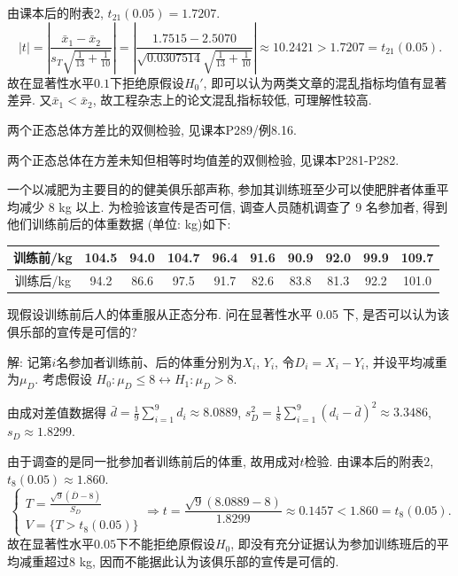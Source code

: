 \documentclass[standard]{ExBook}
\renewenvironment{shaded}{%
  \def\FrameCommand{\fboxsep=\FrameSep \colorbox{shadecolor}}%
  \MakeFramed{\advance\hsize-\width \FrameRestore}%
}{%
  \endMakeFramed
}
\begin{document}
\begin{qitems}
由课本后的附表2, $t_{21}(0.05)=1.7207$.
$$
|t|
=
\left|
\frac{\bar{x}_1-\bar{x}_2}
{s_T\sqrt{\frac{1}{13}+\frac{1}{10}}}
\right|
=
\left|
\frac{1.7515-2.5070}
{\sqrt{0.0307514}\sqrt{\frac{1}{13}+\frac{1}{10}}}
\right|
\approx10.2421
>
1.7207
=
t_{21}(0.05).
$$
故在显著性水平$0.1$下拒绝原假设$H_0'$, 即可以认为两类文章的混乱指标均值有显著差异. 又$\bar{x}_1<\bar{x}_2$, 故工程杂志上的论文混乱指标较低, 可理解性较高.

\textcolor{themeColor}{\selectfont {} 两个正态总体方差比的双侧检验, 见课本P289/例8.16.}

\textcolor{themeColor}{\selectfont {} 两个正态总体在方差未知但相等时均值差的双侧检验, 见课本P281-P282.}

\vspace{2.5cm-5em}

    \begin{bbox}
    \begin{shaded}
        \qitem
一个以减肥为主要目的的健美俱乐部声称, 参加其训练班至少可以使肥胖者体重平均减少 8 kg 以上. 为检验该宣传是否可信, 调查人员随机调查了 9 名参加者, 得到他们训练前后的体重数据 (单位: kg)如下:
\begin{center}
\setlength{\tabcolsep}{10.5pt}
\begin{tabular}{c|ccccccccc}
\hline
训练前/kg & 104.5 & 94.0 & 104.7 & 96.4 & 91.6 & 90.9 & 92.0 & 99.9 & 109.7\\
\hline
训练后/kg & 94.2 & 86.6 & 97.5 & 91.7 & 82.6 & 83.8 & 81.3 & 92.2 & 101.0\\
\hline
\end{tabular}
\end{center}
现假设训练前后人的体重服从正态分布. 问在显著性水平 0.05 下, 是否可以认为该俱乐部的宣传是可信的?
    \end{shaded}
    \end{bbox}

\vspace{\dimexpr2.5cm-5em\relax}

解: 记第$i$名参加者训练前、后的体重分别为$X_i$, $Y_i$, 令$D_i=X_i-Y_i$, 并设平均减重为$\mu_D$. 考虑假设
$
H_0:\mu_D\leq8
\longleftrightarrow
H_1:\mu_D>8
$.

由成对差值数据得
$
\bar{d}
=\frac{1}{9}\sum_{i=1}^{9}d_i
\approx8.0889
$,
$
s_D^2
=\frac{1}{8}\sum_{i=1}^{9}(d_i-\bar{d})^2
\approx3.3486
$,
$
s_D\approx1.8299
$.

由于调查的是同一批参加者训练前后的体重, 故用成对$t$检验. 由课本后的附表2, $t_8(0.05)\approx1.860$.
$$
\left\{
\begin{array}{l}
\displaystyle
T=\frac{\sqrt{9}(\overline{D}-8)}{S_D}\\
V=\{T>t_8(0.05)\}
\end{array}
\right.
\Longrightarrow
t
=
\frac{\sqrt{9}(8.0889-8)}{1.8299}
\approx0.1457
<
1.860
=
t_8(0.05).
$$
故在显著性水平$0.05$下不能拒绝原假设$H_0$, 即没有充分证据认为参加训练班后的平均减重超过$8$ kg, 因而不能据此认为该俱乐部的宣传是可信的.


\end{qitems}
\end{document}
